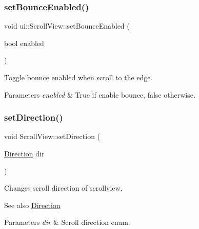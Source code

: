 \subsubsection{\texorpdfstring{set\+Bounce\+Enabled()}{setBounceEnabled()}\hspace{0.1cm}{\footnotesize\ttfamily [2/2]}}
{\footnotesize\ttfamily void ui\+::\+Scroll\+View\+::set\+Bounce\+Enabled (\begin{DoxyParamCaption}\item[{bool}]{enabled }\end{DoxyParamCaption})}



Toggle bounce enabled when scroll to the edge. 


\begin{DoxyParams}{Parameters}
{\em enabled} & True if enable bounce, false otherwise. \\
\hline
\end{DoxyParams}
\mbox{\label{classui_1_1ScrollView_a7b30815b6ca380b56c974b6c0b6aa78e}} 
\subsubsection{\texorpdfstring{set\+Direction()}{setDirection()}\hspace{0.1cm}{\footnotesize\ttfamily [1/2]}}
{\footnotesize\ttfamily void Scroll\+View\+::set\+Direction (\begin{DoxyParamCaption}\item[{\hyperlink{classui_1_1ScrollView_aed2d778ae8098dcafe323b2beae8dd6b}{Direction}}]{dir }\end{DoxyParamCaption})\hspace{0.3cm}{\ttfamily [virtual]}}

Changes scroll direction of scrollview.

\begin{DoxySeeAlso}{See also}
{\ttfamily \hyperlink{classui_1_1ScrollView_aed2d778ae8098dcafe323b2beae8dd6b}{Direction}} 
\end{DoxySeeAlso}

\begin{DoxyParams}{Parameters}
{\em dir} & Scroll direction enum. \\
\hline
\end{DoxyParams}


